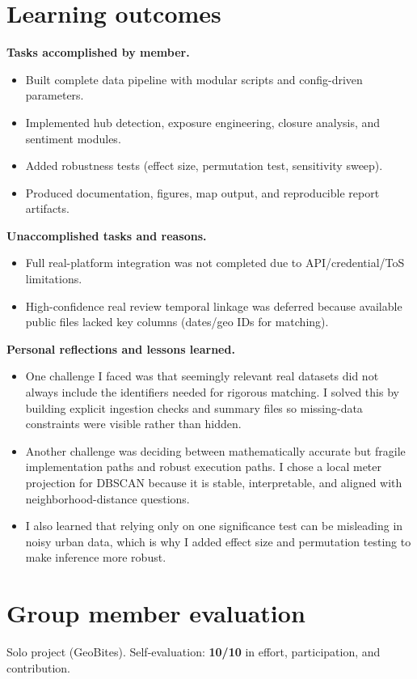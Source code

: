 \documentclass[10pt,twocolumn]{article}
\begin{document}
\section{Learning outcomes}
\textbf{Tasks accomplished by member.}
\begin{itemize}
\item Built complete data pipeline with modular scripts and config-driven parameters.
\item Implemented hub detection, exposure engineering, closure analysis, and sentiment modules.
\item Added robustness tests (effect size, permutation test, sensitivity sweep).
\item Produced documentation, figures, map output, and reproducible report artifacts.
\end{itemize}
\textbf{Unaccomplished tasks and reasons.}
\begin{itemize}
\item Full real-platform integration was not completed due to API/credential/ToS limitations.
\item High-confidence real review temporal linkage was deferred because available public files lacked key columns (dates/geo IDs for matching).
\end{itemize}
\textbf{Personal reflections and lessons learned.}
\begin{itemize}
\item One challenge I faced was that seemingly relevant real datasets did not always include the identifiers needed for rigorous matching. I solved this by building explicit ingestion checks and summary files so missing-data constraints were visible rather than hidden.
\item Another challenge was deciding between mathematically accurate but fragile implementation paths and robust execution paths. I chose a local meter projection for DBSCAN because it is stable, interpretable, and aligned with neighborhood-distance questions.
\item I also learned that relying only on one significance test can be misleading in noisy urban data, which is why I added effect size and permutation testing to make inference more robust.
\end{itemize}

\section{Group member evaluation}
Solo project (GeoBites). Self-evaluation: \textbf{10/10} in effort, participation, and contribution.
\end{document}
